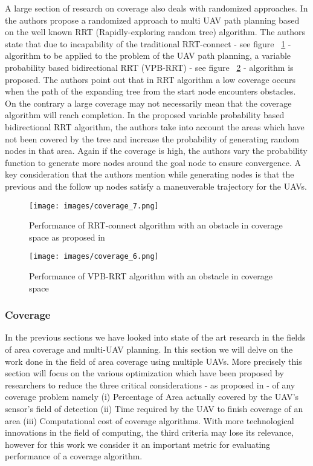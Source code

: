 A large section of research on coverage also deals with randomized approaches. In \cite{9} the authors propose a randomized approach to multi UAV path planning based on the well known RRT (Rapidly-exploring random tree) algorithm. The authors state that due to incapability of the traditional RRT-connect - see figure ~\ref{fig:vvrc} - algorithm to be applied to the problem of the UAV path planning, a variable probability based bidirectional RRT (VPB-RRT) - see figure ~\ref{fig:vvvrrc} - algorithm is proposed. The authors point out that in RRT algorithm a low coverage occurs when the path of the expanding tree from the start node encounters obstacles. On the contrary a large coverage may not necessarily mean that the coverage algorithm will reach completion. In the proposed variable probability based bidirectional RRT algorithm, the authors take into account the areas which have not been covered by the tree and increase the probability of generating random nodes in that area. Again if the coverage is high, the authors vary the probability function to generate more nodes around the goal node to ensure convergence. A key consideration that the authors mention while generating nodes is that the previous and the follow up nodes satisfy a maneuverable trajectory for the UAVs. 

\begin{figure}[htbp] %
 \centering
   \texttt{[image: images/coverage\_7.png]}
   \caption[Performance of RRT algorithm with an obstacle in coverage space \cite{9}]
   {Performance of RRT-connect algorithm with an obstacle in coverage space as proposed in \cite{9}}
   \label{fig:vvrc}
\end{figure}
 
\begin{figure}[htbp] %
 \centering
   \texttt{[image: images/coverage\_6.png]}
   \caption[Performance of VPB-RRT algorithm with an obstacle in coverage space \cite{9}]
   {Performance of VPB-RRT algorithm with an obstacle in coverage space \cite{9}}
   \label{fig:vvvrrc}
\end{figure}
 
\pagebreak
 
\subsubsection{Coverage}
In the previous sections we have looked into state of the art research in the fields of area coverage and multi-UAV planning. In this section we will delve on the work done in the field of area coverage using multiple UAVs. More precisely this section will focus on the various optimization which have been proposed by researchers to reduce the three critical considerations - as proposed in \cite{1} - of any coverage problem namely (i) Percentage of Area actually covered by the UAV's sensor's field of detection (ii) Time required by the UAV to finish coverage of an area (iii) Computational cost of coverage algorithms. With more technological innovations in the field of computing, the third criteria may lose its relevance, however for this work we consider it an important metric for evaluating performance of a coverage algorithm.

